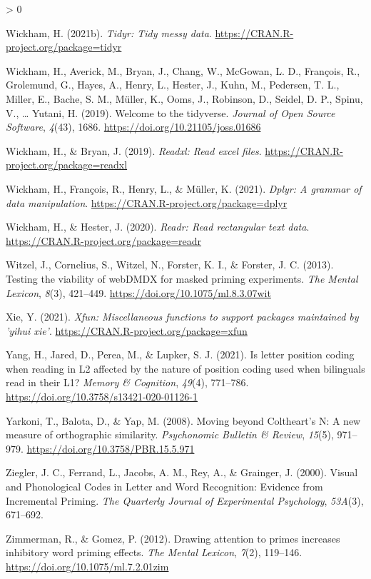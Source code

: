 \documentclass[
  english,
  man,floatsintext]{apa6}
\newlength{\cslhangindent}
\newenvironment{CSLReferences}[2] %
 {%
  \setlength{\parindent}{0pt}
  \ifodd #1 \everypar{\setlength{\hangindent}{\cslhangindent}}\ignorespaces\fi
  \ifnum #2 > 0
  \setlength{\parskip}{#2\baselineskip}
  \fi
 }%
 {}
\begin{document}
\begin{CSLReferences}{1}{0}
\leavevmode\hypertarget{ref-R-tidyr}{}%
Wickham, H. (2021b). \emph{Tidyr: Tidy messy data}. \url{https://CRAN.R-project.org/package=tidyr}

\leavevmode\hypertarget{ref-R-tidyverse}{}%
Wickham, H., Averick, M., Bryan, J., Chang, W., McGowan, L. D., François, R., Grolemund, G., Hayes, A., Henry, L., Hester, J., Kuhn, M., Pedersen, T. L., Miller, E., Bache, S. M., Müller, K., Ooms, J., Robinson, D., Seidel, D. P., Spinu, V., \ldots{} Yutani, H. (2019). Welcome to the {tidyverse}. \emph{Journal of Open Source Software}, \emph{4}(43), 1686. \url{https://doi.org/10.21105/joss.01686}

\leavevmode\hypertarget{ref-R-readxl}{}%
Wickham, H., \& Bryan, J. (2019). \emph{Readxl: Read excel files}. \url{https://CRAN.R-project.org/package=readxl}

\leavevmode\hypertarget{ref-R-dplyr}{}%
Wickham, H., François, R., Henry, L., \& Müller, K. (2021). \emph{Dplyr: A grammar of data manipulation}. \url{https://CRAN.R-project.org/package=dplyr}

\leavevmode\hypertarget{ref-R-readr}{}%
Wickham, H., \& Hester, J. (2020). \emph{Readr: Read rectangular text data}. \url{https://CRAN.R-project.org/package=readr}

\leavevmode\hypertarget{ref-witzelTestingViabilityWebDMDX2013}{}%
Witzel, J., Cornelius, S., Witzel, N., Forster, K. I., \& Forster, J. C. (2013). Testing the viability of {webDMDX} for masked priming experiments. \emph{The Mental Lexicon}, \emph{8}(3), 421--449. \url{https://doi.org/10.1075/ml.8.3.07wit}

\leavevmode\hypertarget{ref-R-xfun}{}%
Xie, Y. (2021). \emph{Xfun: Miscellaneous functions to support packages maintained by 'yihui xie'}. \url{https://CRAN.R-project.org/package=xfun}

\leavevmode\hypertarget{ref-Yang_2021}{}%
Yang, H., Jared, D., Perea, M., \& Lupker, S. J. (2021). Is letter position coding when reading in L2 affected by the nature of position coding used when bilinguals read in their L1? \emph{Memory {\&} Cognition}, \emph{49}(4), 771--786. \url{https://doi.org/10.3758/s13421-020-01126-1}

\leavevmode\hypertarget{ref-yarkoni2008}{}%
Yarkoni, T., Balota, D., \& Yap, M. (2008). Moving beyond Coltheart{'}s N: A new measure of orthographic similarity. \emph{Psychonomic Bulletin \& Review}, \emph{15}(5), 971--979. \url{https://doi.org/10.3758/PBR.15.5.971}

\leavevmode\hypertarget{ref-ziegler2000}{}%
Ziegler, J. C., Ferrand, L., Jacobs, A. M., Rey, A., \& Grainger, J. (2000). Visual and Phonological Codes in Letter and Word Recognition: Evidence from Incremental Priming. \emph{The Quarterly Journal of Experimental Psychology}, \emph{53A}(3), 671--692.

\leavevmode\hypertarget{ref-Zimmerman_2012}{}%
Zimmerman, R., \& Gomez, P. (2012). Drawing attention to primes increases inhibitory word priming effects. \emph{The Mental Lexicon}, \emph{7}(2), 119--146. \url{https://doi.org/10.1075/ml.7.2.01zim}

\end{CSLReferences}
\end{document}
